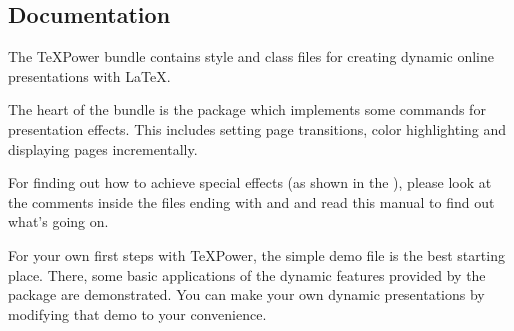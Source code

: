 \begin{slide}\relax


\let\origsection=\section

\renewcommand{\makeslidetitle}[1]
{%
  \let\section\subsection
  \let\subsection\subsubsection
  \def\thanks##1{}%
  \origsection{#1}
}



\makeslidetitle
{%
  Documentation%
  \thanks{Documentation for \TeX Power \tpversion .}%
  }%

The \TeX Power bundle contains style and class files for creating dynamic online presentations with \LaTeX.

The heart of the bundle is the package  which implements some commands for presentation effects. This
includes setting page transitions, color highlighting and displaying pages incrementally.

For finding out how to achieve special effects (as shown in the ),
please look at the comments inside the files ending with  and 
and read this manual to find out what's going on.

\newslide

For your own first steps with \TeX Power, the simple demo file  is the best starting
place. There, some basic applications of the dynamic features provided by the  package are
demonstrated. You can make your own dynamic presentations by modifying that demo to your convenience.


\end{slide}
